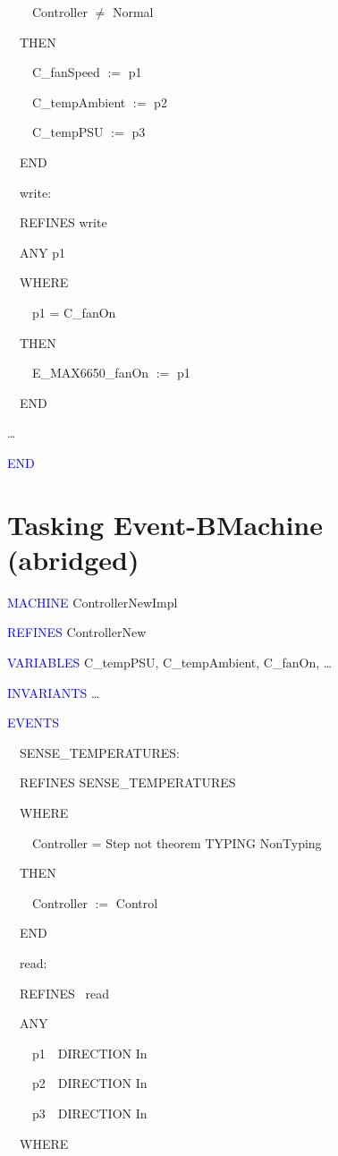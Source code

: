 \documentclass{llncs}%
\begin{document}
\ \ \ \ Controller ${\neq}$ Normal \ \ 

\ \ THEN

\ \ \ \ C\_fanSpeed $:=$ p1 

\ \ \ \ C\_tempAmbient $:=$ p2 \ 

\ \ \ \ C\_tempPSU $:=$ p3 

\ \ END

\bigskip

\ \ write: 

\ \ REFINES write 

\ \ ANY p1\ \  \ 

\ \ WHERE

\ \ \ \ p1 = C\_fanOn \ \ 

\ \ THEN

\ \ \ \ E\_MAX6650\_fanOn $:=$ p1 

\ \ END

\ldots

\textcolor{blue}{END}
%
%
%
\section{Tasking Event-BMachine (abridged)}\label{task}
\textcolor{blue}{MACHINE} ControllerNewImpl \ \ 

\textcolor{blue}{REFINES} ControllerNew \ 

\textcolor{blue}{VARIABLES} C\_tempPSU, C\_tempAmbient, C\_fanOn, {\dots} \ \  \ 

\textcolor{blue}{INVARIANTS} {\dots} 

\bigskip

\textcolor{blue}{EVENTS}

\ \ SENSE\_TEMPERATURES:\ \  \ 

\ \ REFINES SENSE\_TEMPERATURES 

\ \ WHERE

\ \ \ \ Controller = Step not theorem TYPING NonTyping 

\ \ THEN

\ \ \ \ Controller $:=$ Control 

\ \ END

\bigskip

\ \ read:\ \  \ 

\ \ REFINES \ read 

\ \ ANY

\ \ \ \ p1\ \  DIRECTION In 

\ \ \ \ p2\ \  DIRECTION In 

\ \ \ \ p3\ \  DIRECTION In 

\ \ WHERE
\end{document}
